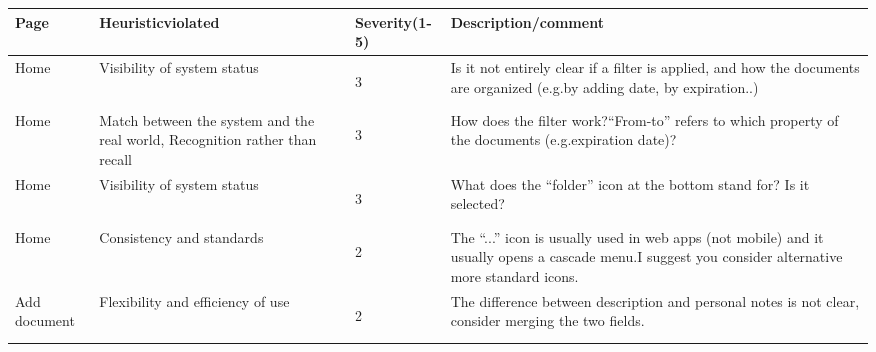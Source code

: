 \begin{table}[H]
	\begin{tabularx}{\textwidth}{|X|X|X|X|}
		\hline
		\textbf{Page} & \textbf{Heuristic\newline violated} & \textbf{Severity(1-5)} & \textbf{Description/\newline comment} \\
		\hline
		Home & Visibility of system status & \begin{center} 3 \end{center} & Is it not entirely clear if a filter is applied, and how the documents are organized (e.g.by adding date, by expiration..) \\
		\hline
		Home & Match between the system and the real world, Recognition rather than recall & \begin{center} 3 \end{center} & How does the filter work?“From-to” refers to which property of the documents (e.g.expiration date)? \\
		\hline
		Home & Visibility of system status & \begin{center} 3 \end{center} & What does the “folder” icon at the bottom stand for? Is it selected? \\
		\hline
		Home & Consistency and standards & \begin{center} 2 \end{center} & The “...” icon is usually used in web apps (not mobile) and it usually opens a cascade menu.I suggest you consider alternative more standard icons. \\
		\hline
		Add document & Flexibility and efficiency of use & \begin{center} 2 \end{center} & The difference between description and personal notes is not clear, consider merging the two fields. \\
		\hline
	\end{tabularx}
\end{table}

